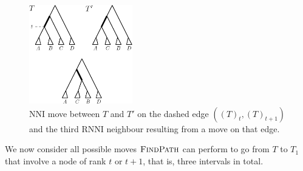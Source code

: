 \documentclass{amsart}
\newcommand{\rnni}{\mathrm{RNNI}}
\newcommand{\findpath}{\textsc{FindPath}}
\newcommand{\nni}{\mathrm{NNI}}
\begin{document}
\begin{figure}[!hbt]
\centering
\includegraphics[width=0.4\textwidth]{thm_fp_nni1}
\vspace{12pt}
\caption{$\nni$ move between $T$ and $T'$ on the dashed edge $((T)_t,(T)_{t+1})$ and the third $\rnni$ neighbour resulting from a move on that edge.}
\label{fig:thm_fp_nni1}
\end{figure}

We now consider all possible moves $\findpath$ can perform to go from $T$ to $T_1$ that involve a node of rank $t$ or $t+1$, that is, three intervals in total.
\end{document}
